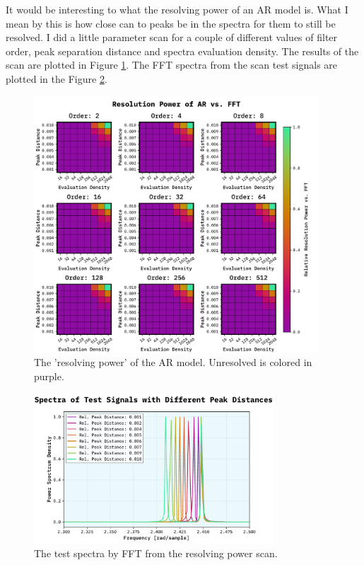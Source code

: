 \documentclass[10pt, titlepage, a4paper]{article}
\begin{document}
It would be interesting to what the resolving power of an AR model is. What I mean by this is how close can to peaks 
be in the spectra for them to still be resolved. I did a little parameter scan for a couple of different values of filter 
order, peak separation distance and spectra evaluation density. The results of the scan are plotted in Figure 
\ref{fig:resolving-power}. The FFT spectra from the scan test signals are plotted in the Figure \ref{fig:resolving-power-test}.

\begin{figure}[H]
    \centering
    \includegraphics[width=0.95\textwidth]{../MaxEntropy/Images/s-res.pdf}
    \caption{The 'resolving power' of the AR model. Unresolved is colored in purple.}
    \label{fig:resolving-power}
\end{figure}

\begin{figure}[H]
    \centering
    \includegraphics[width=0.8\textwidth]{../MaxEntropy/Images/test-spectra.pdf}
    \caption{The test spectra by FFT from the resolving power scan.}
    \label{fig:resolving-power-test}
\end{figure}
\end{document}
